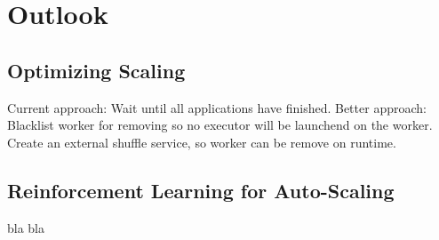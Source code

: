 \chapter{Outlook}
\label{sec:outlook}
%

\section{Optimizing Scaling}
Current approach: Wait until all applications have finished.
Better approach: Blacklist worker for removing so no executor will be launchend on the worker.
Create an external shuffle service, so worker can be remove on runtime.


\section{Reinforcement Learning for Auto-Scaling}
bla bla

